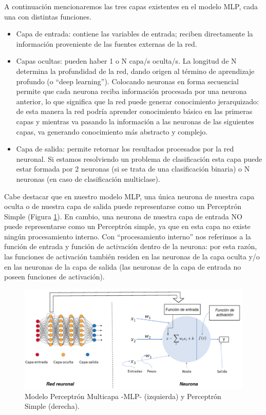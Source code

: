 \documentclass[12pt,a4paper]{article}
\begin{document}
\begin{sloppypar}
A continuación mencionaremos las tres capas existentes en el modelo MLP, cada una con distintas funciones.
\begin{itemize}
\item Capa de entrada: contiene las variables de entrada; reciben directamente la información proveniente de las fuentes externas de la red.
\item Capas ocultas: pueden haber 1 o N capa/s oculta/s. La longitud de N determina la profundidad de la red, dando origen al término de aprendizaje profundo (o “deep learning”). Colocando neuronas en forma secuencial permite que cada neurona reciba información procesada por una neurona anterior, lo que significa que la red puede generar conocimiento jerarquizado: de esta manera la red podría aprender conocimiento básico en las primeras capas y mientras va pasando la información a las neuronas de las siguientes capas, va generando conocimiento más abstracto y complejo.
\item Capa de salida: permite retornar los resultados procesados por la red neuronal. Si estamos resolviendo un problema de clasificación esta capa puede estar formada por 2 neuronas (si se trata de una clasificación binaria) o N neuronas (en caso de clasificación multiclase). 
\end{itemize}

Cabe destacar que en nuestro modelo MLP, una única neurona de nuestra capa oculta o de nuestra capa de salida puede representarse como un Perceptrón Simple (Figura \ref{fig:ann_3}). En cambio, una neurona de nuestra capa de  entrada NO puede representarse como un Perceptrón simple, ya que en esta capa no existe ningún procesamiento interno. Con “procesamiento interno” nos referimos a la función de entrada y función de activación dentro de la neurona: por esta razón, las funciones de activación también residen en las neuronas de la capa oculta y/o en las neuronas de la capa de salida (las neuronas de la capa de entrada no poseen funciones de activación). 

\begin{figure}[H]    %
 \centering
 \includegraphics[width=1\textwidth]{images/ANN/3-ANN.png}
 \captionsetup{justification=centering,margin=3cm}
 \caption[Modelo Perceptrón Multicapa -MLP- (izquierda) y Perceptrón Simple (derecha).]{Modelo Perceptrón Multicapa -MLP- (izquierda) y Perceptrón Simple (derecha).}
 \label{fig:ann_3}
\end{figure}


\end{sloppypar}
\end{document}
